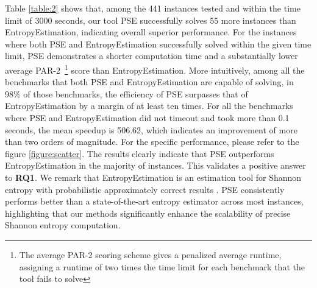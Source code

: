 Table \ref{table:2} shows that, among the 441 instances tested and within the time limit of 3000 seconds, our tool PSE successfully solves 55 more instances than EntropyEstimation, indicating overall superior performance.
For the instances where both PSE and EntropyEstimation successfully solved within the given time limit, PSE demonstrates a shorter computation time and a substantially lower average PAR-2~\footnote{The average PAR-2 scoring scheme gives a penalized average runtime, assigning a runtime of two times the time limit for each benchmark that the tool fails to solve} score than EntropyEstimation.
More intuitively,  among all the benchmarks that both PSE and EntropyEstimation are capable of solving, in 98\% of those benchmarks, the efficiency of PSE surpasses that of EntropyEstimation by a margin of at least ten times.
For all the benchmarks where PSE and EntropyEstimation did not timeout and took more than 0.1 seconds, the mean speedup is 506.62, which indicates an improvement of more than two orders of magnitude. 
For the specific performance, please refer to the figure \ref{figure:scatter}.
The results clearly indicate that PSE outperforms EntropyEstimation in the majority of instances. This validates a positive answer to \textbf{RQ1}.
We remark that EntropyEstimation is an estimation tool for Shannon entropy with probabilistic approximately correct results \cite{golia2022scalable}.
PSE consistently performs better than a state-of-the-art entropy estimator across most instances, highlighting that our methods significantly enhance the scalability of precise Shannon entropy computation.






